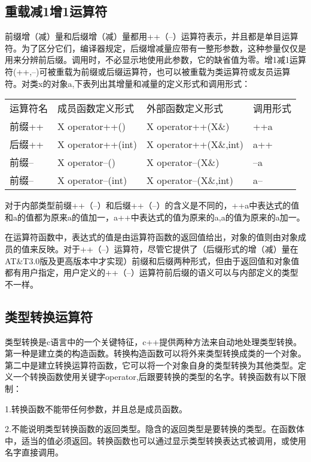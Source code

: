\documentclass{article}
\begin{document}
\subsection{重载减1增1运算符}
\label{sec-9-6}

前缀增（减）量和后缀增（减）量都用++（--）运算符表示，并且都是单目运算符。为了区分它们，编译器规定，后缀增减量应带有一整形参数，这种参量仅仅是用来分辨前后缀。调用时，不必显示地使用此参数，它的缺省值为零。增1减1运算符(++,--)可被重载为前缀或后缀运算符，也可以被重载为类运算符或友员运算符。对类x的对象a,下表列出其增量和减量的定义形式和调用形式： 

\begin{center}
\begin{tabular}{llll}
运算符名 & 成员函数定义形式 & 外部函数定义形式 & 调用形式\\
前缀++ & X operator++() & X operator++(X\&) & ++a\\
后缀++ & X operator++(int) & X operator++(X\&,int) & a++\\
前缀-- & X operator--() & X operator--(X\&) & --a\\
前缀-- & X operator--(int) & X operator--(X\&,int) & a--\\
\end{tabular}
\end{center}

对于内部类型前缀++（--）和后缀++（--）的含义是不同的，++a中表达式的值和a的值都为原来a的值加一，a++中表达式的值为原来的a,a的值为原来的a加一。

在运算符函数中，表达式的值是由运算符函数的返回值给出，对象的值则由对象成员的值来反映。对于++（--）运算符，尽管它提供了（后缀形式的增（减）量在AT\&T3.0版及更高版本中才实现）前缀和后缀两种形式，但由于返回值和对象值都有用户指定，用户定义的++（--）运算符前后缀的语义可以与内部定义的类型不一样。
\subsection{类型转换运算符}
\label{sec-9-7}

类型转换是c语言中的一个关键特征，c++提供两种方法来自动地处理类型转换。第一种是建立类的构造函数。转换构造函数可以将外来类型转换成类的一个对象。第二中是建立转换运算符函数，它可以将一个对象自身的类型转换为其他类型。定义一个转换函数使用关键字operator,后跟要转换的类型的名字。转换函数有以下限制：

1.转换函数不能带任何参数，并且总是成员函数。

2.不能说明类型转换函数的返回类型。隐含的返回类型是要转换的类型。在函数体中，适当的值必须返回。转换函数也可以通过显示类型转换表达式被调用，或使用名字直接调用。
\end{document}
